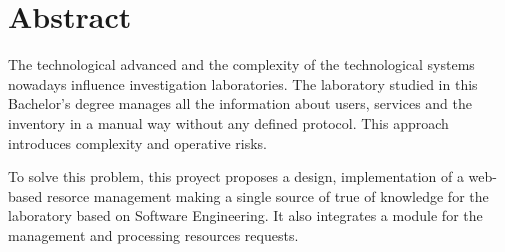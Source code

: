 \chapter*{Abstract}




The technological advanced and the complexity of the technological systems nowadays influence investigation laboratories. The laboratory studied in this Bachelor's degree manages all the information about users, services and the inventory in a manual way without any defined protocol. This approach introduces complexity and operative risks.

To solve this problem, this proyect proposes a design, implementation of a web-based resorce management making a single source of true  of knowledge for the laboratory based on Software Engineering. It also integrates a module for the management and processing resources requests.


